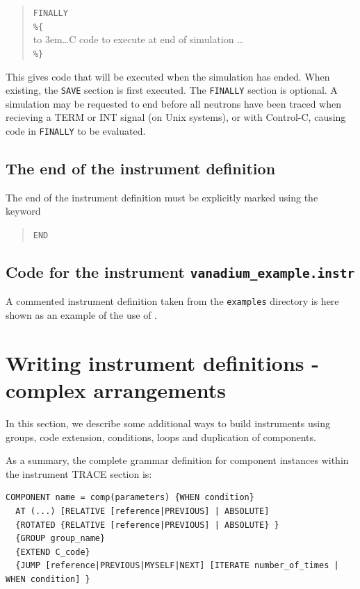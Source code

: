 \begin{quote}
  \texttt{FINALLY} \\
  \verb|%{| \\
  \hbox to 3em{}\ldots C code to execute at end of simulation \ldots \\
  \verb|%}|
\end{quote}
This gives code that will be executed when the simulation has
ended. When existing, the \texttt{SAVE} section is first executed. The
\texttt{FINALLY} section is optional.
A simulation may be requested to end before all neutrons have been
traced when recieving a TERM or INT signal (on Unix systems), or with
Control-C, causing code in \texttt{FINALLY} to be evaluated.
 


\subsection{The end of the instrument definition}
\label{s:end}

The end of the instrument definition must be explicitly marked using the keyword
\begin{quote}
  \texttt{END}
\end{quote}

\subsection{Code for the instrument \texttt{vanadium\_example.instr}}
\label{s:vanadium_example.instr}
A commented instrument definition taken from the \texttt{examples} directory is
here shown as an example of the use of \MCS .



\section{Writing instrument definitions - complex arrangements}
\label{s:instrdefs-extend}

In this section, we describe some additional ways to build instruments using groups, code extension, conditions, loops and duplication of components.

As a summary, the complete grammar definition for component instances within the instrument TRACE section is:

\begin{verbatim}
COMPONENT name = comp(parameters) {WHEN condition}
  AT (...) [RELATIVE [reference|PREVIOUS] | ABSOLUTE]
  {ROTATED {RELATIVE [reference|PREVIOUS] | ABSOLUTE} }
  {GROUP group_name}
  {EXTEND C_code}
  {JUMP [reference|PREVIOUS|MYSELF|NEXT] [ITERATE number_of_times | WHEN condition] }
\end{verbatim}

